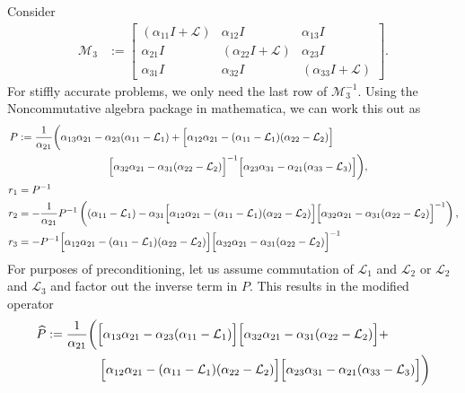 \documentclass[a4paper,10pt]{article}
\begin{document}
Consider 
%
\begin{align}\label{eq:Mnt}
\mathcal{M}_3 &:= \begin{bmatrix} (\alpha_{11} I + \mathcal{L}) & \alpha_{12}I & \alpha_{13}I \\
    \alpha_{21}I & (\alpha_{22}I + \mathcal{L}) & \alpha_{23} I \\
    \alpha_{31}I & \alpha_{32}I & (\alpha_{33} I + \mathcal{L}) \end{bmatrix}.
\end{align}
%
For stiffly accurate problems, we only need the last row of $\mathcal{M}_3^{-1}$. Using
the Noncommutative algebra package in mathematica, we can work this out as
%
\begin{align*}
P & := \frac{1}{\alpha_{21}} \bigg(\alpha_{13}\alpha_{21} - \alpha_{23} (\alpha_{11} - \mathcal{L}_1)
 	+ \Big[\alpha_{12}\alpha_{21} - (\alpha_{11} - \mathcal{L}_1)(\alpha_{22} - \mathcal{L}_2)\Big]
 	\\ &\hspace{20ex} 
 	\Big[\alpha_{32}\alpha_{21} - \alpha_{31} (\alpha_{22} - \mathcal{L}_2)\Big]^{-1}
 	\Big[\alpha_{23}\alpha_{31} - \alpha_{21}(\alpha_{33} - \mathcal{L}_3)\Big]\bigg),
\\
r_1 & = P^{-1} \\
r_2 & = -\frac{1}{\alpha_{21}} P^{-1} \left( (\alpha_{11} - \mathcal{L}_1) -
\alpha_{31} \Big[\alpha_{12}\alpha_{21} - (\alpha_{11} - \mathcal{L}_1)
	(\alpha_{22} - \mathcal{L}_2)\Big]
	\Big[\alpha_{32}\alpha_{21} - \alpha_{31} (\alpha_{22} - \mathcal{L}_2)\Big]^{-1}\right),
\\
r_3 & = - P^{-1} \Big[\alpha_{12}\alpha_{21} - (\alpha_{11} - \mathcal{L}_1) (\alpha_{22} - \mathcal{L}_2)\Big] \Big[\alpha_{32}\alpha_{21} -
\alpha_{31}(\alpha_{22} - \mathcal{L}_2)\Big]^{-1}
\end{align*}
%
For purposes of preconditioning, let us assume commutation of $\mathcal{L}_1$ and
$\mathcal{L}_2$ or $\mathcal{L}_2$ and $\mathcal{L}_3$ and factor out the inverse
term in $P$. This results in the modified operator
%
\begin{align*}
\widehat{P} &:= \frac{1}{\alpha_{21}} \bigg(
	\Big[\alpha_{13}\alpha_{21} - \alpha_{23} (\alpha_{11} - \mathcal{L}_1)\Big]
	\Big[\alpha_{32}\alpha_{21} - \alpha_{31} (\alpha_{22} - \mathcal{L}_2)\Big] +
\\ &\hspace{10ex} 
 	\Big[\alpha_{12}\alpha_{21} - (\alpha_{11} - \mathcal{L}_1)(\alpha_{22} - \mathcal{L}_2)\Big]
 	\Big[\alpha_{23}\alpha_{31} - \alpha_{21}(\alpha_{33} - \mathcal{L}_3)\Big]\bigg)
\end{align*}
%
\end{document}
